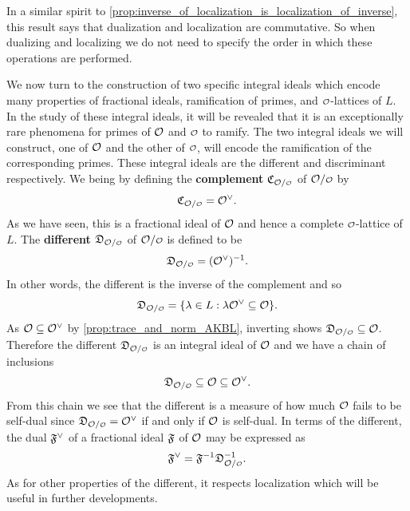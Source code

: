     In a similar spirit to \cref{prop:inverse_of_localization_is_localization_of_inverse}, this result says that dualization and localization are commutative. So when dualizing and localizing we do not need to specify the order in which these operations are performed.
    
    We now turn to the construction of two specific integral ideals which encode many properties of fractional ideals, ramification of primes, and \(\smc{O}\)-lattices of \(L\). In the study of these integral ideals, it will be revealed that it is an exceptionally rare phenomena for primes of \(\mathcal{O}\) and \(\smc{O}\) to ramify. The two integral ideals we will construct, one of \(\mathcal{O}\) and the other of \(\smc{O}\), will encode the ramification of the corresponding primes. These integral ideals are the different and discriminant respectively. We being by defining the \textbf{complement} \(\mf{C}_{\mc{O}/\smc{O}}\) of \(\mc{O}/\smc{O}\) by
    \[
      \mf{C}_{\mc{O}/\smc{O}} = \mc{O}^{\vee}.  
    \]
    As we have seen, this is a fractional ideal of \(\mathcal{O}\) and hence a complete \(\smc{O}\)-lattice of \(L\). The \textbf{different} \(\mf{D}_{\mc{O}/\smc{O}}\) of \(\mc{O}/\smc{O}\) is defined to be
    \[
      \mf{D}_{\mc{O}/\smc{O}} = (\mc{O}^{\vee})^{-1}.  
    \]
    In other words, the different is the inverse of the complement and so
    \[
      \mf{D}_{\mc{O}/\smc{O}} = \{\l \in L: \l\mc{O}^{\vee} \subseteq \mc{O}\}.  
    \]
    As \(\mathcal{O} \subseteq \mathcal{O}^{\vee}\) by \cref{prop:trace_and_norm_AKBL}, inverting shows \(\mf{D}_{\mc{O}/\smc{O}} \subseteq \mc{O}\). Therefore the different \(\mf{D}_{\mc{O}/\smc{O}}\) is an integral ideal of \(\mathcal{O}\) and we have a chain of inclusions
    \[
      \mf{D}_{\mc{O}/\smc{O}} \subseteq \mc{O} \subseteq \mc{O}^{\vee}.
    \]
    From this chain we see that the different is a measure of how much \(\mathcal{O}\) fails to be self-dual since \(\mf{D}_{\mc{O}/\smc{O}} = \mc{O}^{\vee}\) if and only if \(\mathcal{O}\) is self-dual. In terms of the different, the dual \(\mathfrak{F}^{\vee}\) of a fractional ideal \(\mathfrak{F}\) of \(\mathcal{O}\) may be expressed as
    \begin{equation}\label{equ:dual_in_terms_of_inverse_and_different}
      \mf{F}^{\vee} = \mf{F}^{-1}\mf{D}_{\mc{O}/\smc{O}}^{-1}.
    \end{equation}
    As for other properties of the different, it respects localization which will be useful in further developments.

